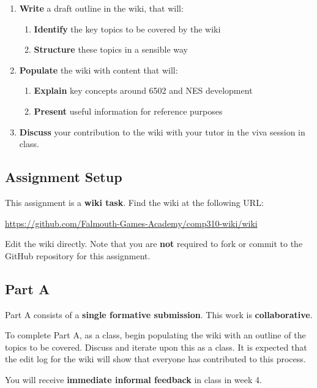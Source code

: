 \documentclass{../../fal_assignment}
\begin{document}
\begin{enumerate}[label=(\Alph*)]
    \item \textbf{Write} a draft outline in the wiki, that will:
    	\begin{enumerate}[label=(\roman*)]
    		\item \textbf{Identify} the key topics to be covered by the wiki
    		\item \textbf{Structure} these topics in a sensible way
    	\end{enumerate}
    \item \textbf{Populate} the wiki with content that will:
    	\begin{enumerate}[label=(\roman*)]
    		\item \textbf{Explain} key concepts around 6502 and NES development
    		\item \textbf{Present} useful information for reference purposes
    	\end{enumerate}
    \item \textbf{Discuss} your contribution to the wiki with your tutor in the viva session in class.
\end{enumerate}

\subsection*{Assignment Setup}

This assignment is a \textbf{wiki task}. Find the wiki at the following URL:

\indent \url{https://github.com/Falmouth-Games-Academy/comp310-wiki/wiki}

Edit the wiki directly. Note that you are \textbf{not} required to fork or commit to the GitHub repository
for this assignment.

\subsection*{Part A}

Part A consists of a \textbf{single formative submission}. This work is \textbf{collaborative}.

To complete Part A, as a class, begin populating the wiki with an outline of the topics to be covered.
Discuss and iterate upon this as a class.
It is expected that the edit log for the wiki will show that everyone has contributed to this process.

You will receive \textbf{immediate informal feedback} in class in week 4.
\end{document}
